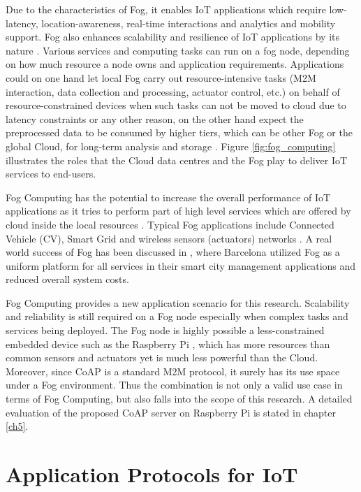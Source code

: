 Due to the characteristics of Fog, it enables IoT applications which require low-latency, location-awareness, real-time interactions and analytics and mobility support. Fog also enhances scalability and resilience of IoT applications by its nature \cite{7123563}. Various services and computing tasks can run on a fog node, depending on how much resource a node owns and application requirements. Applications could on one hand let local Fog carry out resource-intensive tasks (M2M interaction, data collection and processing, actuator control, etc.) on behalf of resource-constrained devices when such tasks can not be moved to cloud due to latency constraints or any other reason, on the other hand expect the preprocessed data to be consumed by higher tiers, which can be other Fog or the global Cloud, for long-term analysis and storage \cite{Bonomi:2012:FCR:2342509.2342513}\cite{7498684}. Figure \ref{fig:fog_computing} illustrates the roles that the Cloud data centres and the Fog play to deliver IoT services to end-users. 

Fog Computing has the potential to increase the overall performance of IoT applications as it tries to perform part of high level services which are offered by cloud inside the local resources \cite{7123563}. Typical Fog applications include Connected Vehicle (CV), Smart Grid and wireless sensors (actuators) networks \cite{Bonomi:2012:FCR:2342509.2342513}. A real world success of Fog has been discussed in \cite{7498684}, where Barcelona utilized Fog as a uniform platform for all services in their smart city management applications and reduced overall system costs.

Fog Computing provides a new application scenario for this research. Scalability and reliability is still required on a Fog node especially when complex tasks and services being deployed. The Fog node is highly possible a less-constrained embedded device such as the Raspberry Pi \cite{raspberry_pi}, which has more resources than common sensors and actuators yet is much less powerful than the Cloud. Moreover,  since CoAP is a standard M2M protocol, it surely has its use space under a Fog environment. Thus the combination is not only a valid use case in terms of Fog Computing, but also falls into the scope of this research. A detailed evaluation of the proposed CoAP server on Raspberry Pi is stated in chapter \ref{ch5}.

\section{Application Protocols for IoT} \label{IoT_protocols}

